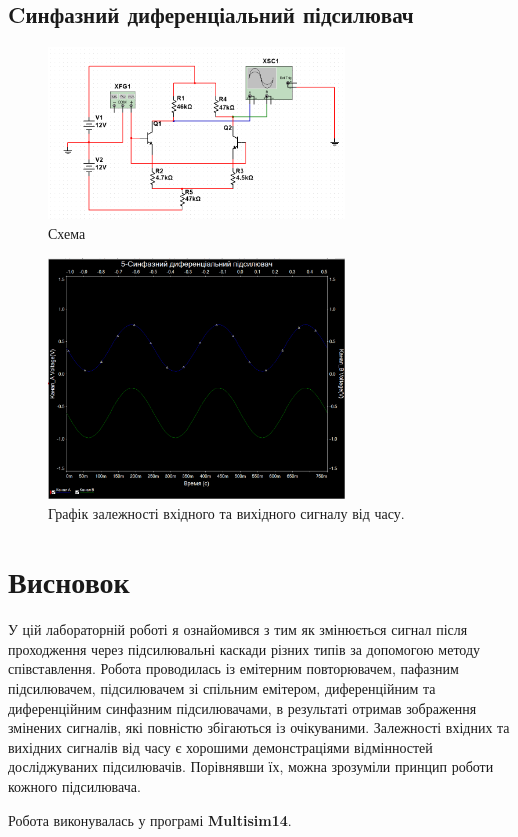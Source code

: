 \documentclass[
  ukrainian,
  14pt
]{extreport}
\begin{document}
\subsection{Cинфазний диференціальний підсилювач}
\begin{figure}[H]
  \includegraphics[width=0.7\textwidth]{imgs/5-1.png}
  \centering
  \caption{Схема}
\end{figure}
\begin{figure}[H]
  \includegraphics[width=0.7\textwidth]{imgs/5-2.png}
  \centering
  \caption{Графік залежності вхідного та вихідного сигналу від часу.
  }
\end{figure}
\section{Висновок}
У цій лабораторній роботі я ознайомився з тим як змінюється сигнал
після проходження через підсилювальні каскади різних типів за допомогою
методу співставлення. Робота проводилась із емітерним повторювачем,
пафазним підсилювачем, підсилювачем зі спільним емітером,
диференційним та диференційним синфазним підсилювачами, в результаті
отримав зображення змінених сигналів, які повністю збігаються із
очікуваними. Залежності вхідних та вихідних сигналів від часу є хорошими
демонстраціями відмінностей досліджуваних підсилювачів. Порівнявши їх, можна
зрозуміли принцип роботи кожного підсилювача.

Робота виконувалась у програмі \textbf{Multisim14}.
\end{document}
